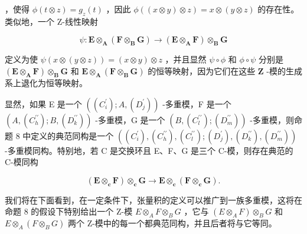 ，使得 \(\phi(t \otimes z) = g_z(t)\) ，因此 \(\phi((x \otimes y) \otimes z) = x \otimes (y \otimes z)\) 的存在性。类似地，一个 Z-线性映射

\[
\psi : \mathbf {E} \otimes_ {\mathbf {A}} (\mathbf {F} \otimes_ {\mathbf {B}} \mathbf {G}) \rightarrow (\mathbf {E} \otimes_ {\mathbf {A}} \mathbf {F}) \otimes_ {\mathbf {B}} \mathbf {G}
\]

定义为使 \(\psi(x \otimes (y \otimes z)) = (x \otimes y) \otimes z\) ，并且显然 \(\psi \circ \phi\) 和 \(\phi \circ \psi\) 分别是 \((\mathbf{E} \otimes_{\mathbf{A}} \mathbf{F}) \otimes_{\mathbf{B}} \mathbf{G}\) 和 \(\mathbf{E} \otimes_{\mathbf{A}} (\mathbf{F} \otimes_{\mathbf{B}} \mathbf{G})\) 的恒等映射，因为它们在这些 \(\mathbf{Z}\) -模的生成系上退化为恒等映射。

显然，如果 E 是一个 \(((C_{i}^{\prime}); A, (D_{j}^{\prime}))\) -多重模，F 是一个 \((A, (C_{h}^{\prime\prime}); B, (D_{k}^{\prime\prime}))\) -多重模，G 是一个 \((B, (C_{l}^{\prime\prime}); (D_{m}^{\prime\prime}))\) -多重模，则命题 8 中定义的典范同构是一个 \(((C_{i}^{\prime}), (C_{h}^{\prime\prime}), (C_{l}^{\prime\prime}); (D_{j}^{\prime}), (D_{k}^{\prime\prime}), (D_{m}^{\prime\prime}))\) -多重模同构。特别地，若 C 是交换环且 E、F、G 是三个 C-模，则存在典范的 C-模同构

\[
(\mathbf {E} \otimes_ {\mathbf {c}} \mathbf {F}) \otimes_ {\mathbf {c}} \mathbf {G} \rightarrow \mathbf {E} \otimes_ {\mathbf {c}} (\mathbf {F} \otimes_ {\mathbf {c}} \mathbf {G}).
\]

我们将在下面看到，在一定条件下，张量积的定义可以推广到一族多重模，这将在命题 8 的假设下特别给出一个 Z-模 \(E \otimes_{A} F \otimes_{B} G\) ，它与 \((E \otimes_{A} F) \otimes_{B} G\) 和 \(E \otimes_{A} (F \otimes_{B} G)\) 两个 Z-模中的每一个都典范同构，并且后者将与它等同。

